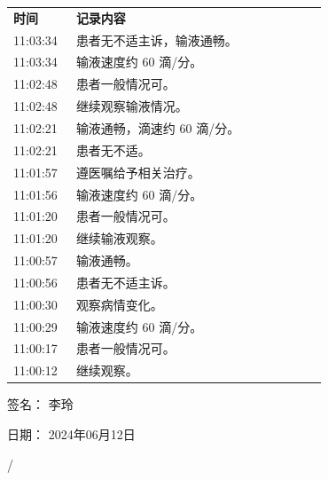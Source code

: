 \documentclass[UTF8,10pt,a4paper,fontset=fandol]{ctexart}
\newcommand{\fieldvalue}[1]{#1}
\newcommand{\handwritten}[1]{#1}
\begin{document}
\begin{tabular}{p{0.18\linewidth}p{0.72\linewidth}}
\textbf{时间} & \textbf{记录内容}\\
11:03:34 & 患者无不适主诉，输液通畅。\\
11:03:34 & 输液速度约 60 滴/分。\\
11:02:48 & 患者一般情况可。\\
11:02:48 & 继续观察输液情况。\\
11:02:21 & 输液通畅，滴速约 60 滴/分。\\
11:02:21 & 患者无不适。\\
11:01:57 & 遵医嘱给予相关治疗。\\
11:01:56 & 输液速度约 60 滴/分。\\
11:01:20 & 患者一般情况可。\\
11:01:20 & 继续输液观察。\\
11:00:57 & 输液通畅。\\
11:00:56 & 患者无不适主诉。\\
11:00:30 & 观察病情变化。\\
11:00:29 & 输液速度约 60 滴/分。\\
11:00:17 & 患者一般情况可。\\
11:00:12 & 继续观察。\\
\end{tabular}


\vspace{2em}

\noindent 签名：%
\fieldvalue{\handwritten{李玲}}

\noindent 日期：%
\fieldvalue{\handwritten{2024年06月12日}}

\noindent\handwritten{4/}

\newpage
\end{document}
